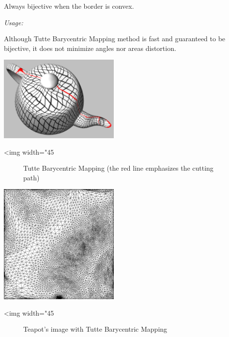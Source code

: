 Always bijective when the border is convex.

\emph{Usage:}

Although Tutte Barycentric Mapping method is fast and
guaranteed to be bijective, it does not minimize angles nor areas
distortion.

\begin{center}
    \label{Surface_mesh_parameterization-fig-uniform}
    \begin{ccTexOnly}
        \includegraphics[width=0.45\textwidth]{Surface_mesh_parameterization/uniform}
    \end{ccTexOnly}
    \begin{ccHtmlOnly}
        <img width="45%
    \end{ccHtmlOnly}
    \begin{figure}[h]
        \caption{Tutte Barycentric Mapping (the red line emphasizes the cutting path)}
    \end{figure}
\end{center}

\begin{center}
    \label{Surface_mesh_parameterization-fig-uniform_2}
    \begin{ccTexOnly}
        \includegraphics[width=0.45\textwidth]{Surface_mesh_parameterization/uniform_2}
    \end{ccTexOnly}
    \begin{ccHtmlOnly}
        <img width="45%
    \end{ccHtmlOnly}
    \begin{figure}[h]
        \caption{Teapot's image with Tutte Barycentric Mapping}
    \end{figure}
\end{center}


